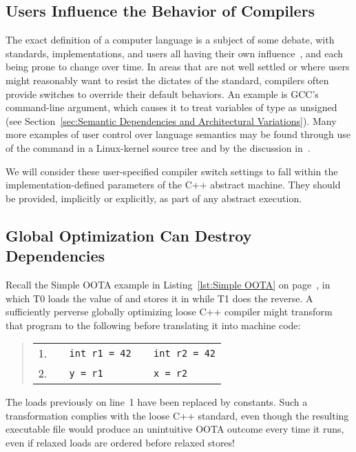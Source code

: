 \subsection{Users Influence the Behavior of Compilers}
\label{sec:Users Influence the Behavior of Compilers}

The exact definition of a computer language is a subject of some debate,
with standards, implementations, and users all having their own
influence~\cite{KayvanMemarian2016DepthOfC-1,KayvanMemarian2016DepthOfC-2},
and each being prone to change over time.
In areas that are not well settled or where users might reasonably
want to resist the dictates of the standard,
compilers often provide switches to override their default behaviors.
An example is GCC's  command-line argument,
which causes it to treat variables of type  as unsigned
(see Section~\ref{sec:Semantic Dependencies and Architectural Variations}).
Many more examples of user control over language semantics
may be found through use of the command 
in a Linux-kernel source tree and by the discussion
in~\cite{KayvanMemarian2016DepthOfC-1,KayvanMemarian2016DepthOfC-2}.

We will consider these user-specified compiler switch settings to fall
within the implementation-defined parameters of the C++ abstract machine.
They should be provided, implicitly or explicitly, as part of any
abstract execution.

\subsection{Global Optimization Can Destroy Dependencies}
\label{sec:Global Optimization Can Destroy Dependencies}

Recall the Simple OOTA example in Listing~\ref{lst:Simple OOTA} on
page~\pageref{lst:Simple OOTA},
in which T0 loads the value of  and stores it in  while T1
does the reverse.
A sufficiently perverse globally optimizing loose C++ compiler might
transform that program to the following before translating it into
machine code:
\begin{quote}
\small
\begin{tabular}{r|l|l}
1. &
\texttt{~~int r1 = 42} &
	\texttt{~~int r2 = 42} \\
2. &
\texttt{~~y = r1} &
	\texttt{~~x = r2} \\
\end{tabular}
\end{quote}
The loads previously on line~1 have been replaced by constants.
Such a transformation complies with the loose C++ standard,
even though the resulting executable file would produce an unintuitive
OOTA outcome every time it runs, even if relaxed loads are ordered
before relaxed stores!

